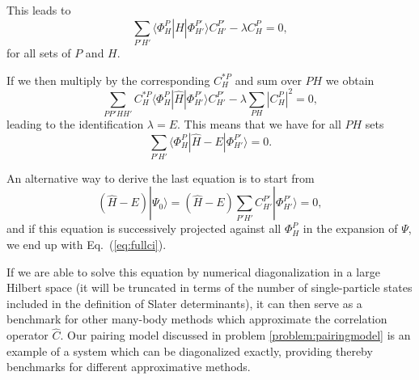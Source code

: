   This leads to
  \[
  \sum_{P'H'}\langle \Phi_H^P | \hat{H} |\Phi_{H'}^{P'} \rangle
  C_{H'}^{P'}-\lambda C_H^{P}=0,
  \]
  for all sets of $P$ and $H$.

  If we then multiply by the corresponding $C_H^{*P}$ and sum over
  $PH$ we obtain
  \[ 
  \sum_{PP'HH'}C_H^{*P}\langle \Phi_H^P | \hat{H} |\Phi_{H'}^{P'}
  \rangle C_{H'}^{P'}-\lambda\sum_{PH}|C_H^P|^2=0,
  \]
  leading to the identification $\lambda = E$. This means that we have
  for all $PH$ sets
  \begin{equation}
  \sum_{P'H'}\langle \Phi_H^P | \hat{H} -E|\Phi_{H'}^{P'} \rangle =
  0. \label{eq:fullci}
  \end{equation}



  An alternative way to derive the last equation is to start from
  \[
  (\hat{H} -E)|\Psi_0\rangle = (\hat{H}
  -E)\sum_{P'H'}C_{H'}^{P'}|\Phi_{H'}^{P'} \rangle=0,
  \]
  and if this equation is successively projected against all
  $\Phi_H^P$ in the expansion of $\Psi$, we end up with
  Eq.~(\ref{eq:fullci}).

  If we are able to solve this equation by numerical diagonalization in
  a large Hilbert space (it will be truncated in terms of the number
  of single-particle states included in the definition of Slater
  determinants), it can then serve as a benchmark for other many-body
  methods which approximate the correlation operator $\hat{C}$.  Our
  pairing model discussed in problem \ref{problem:pairingmodel} is an
  example of a system which can be diagonalized exactly, providing
  thereby benchmarks for different approximative methods.


